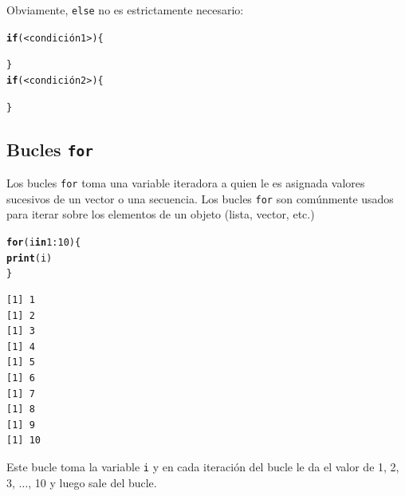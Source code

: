 \documentclass{article}\usepackage[]{graphicx}\usepackage[]{color}
\makeatletter
\newcommand{\hlnum}[1]{\textcolor[rgb]{0.686,0.059,0.569}{#1}}%
\newcommand{\hlopt}[1]{\textcolor[rgb]{0,0,0}{#1}}%
\newcommand{\hlstd}[1]{\textcolor[rgb]{0.345,0.345,0.345}{#1}}%
\newcommand{\hlkwa}[1]{\textcolor[rgb]{0.161,0.373,0.58}{\textbf{#1}}}%
\newcommand{\hlkwd}[1]{\textcolor[rgb]{0.737,0.353,0.396}{\textbf{#1}}}%
\newenvironment{kframe}{%
 \def\at@end@of@kframe{}%
 \ifinner\ifhmode%
  \def\at@end@of@kframe{\end{minipage}}%
  \begin{minipage}{\columnwidth}%
 \fi\fi%
 \def\FrameCommand##1{\hskip\@totalleftmargin \hskip-\fboxsep
 \colorbox{shadecolor}{##1}\hskip-\fboxsep
     \hskip-\linewidth \hskip-\@totalleftmargin \hskip\columnwidth}%
 \MakeFramed {\advance\hsize-\width
   \@totalleftmargin\z@ \linewidth\hsize
   \@setminipage}}%
 {\par\unskip\endMakeFramed%
 \at@end@of@kframe}
\newenvironment{knitrout}{}{} %
\makeatother
\begin{document}
  Obviamente, \texttt{else} no es estrictamente necesario:
\begin{knitrout}
\color{fgcolor}\begin{kframe}
\begin{alltt}
  \hlkwd{if}(<condición1>) \{

  \} 
  \hlkwd{if}(<condición2>) \{

  \}
\end{alltt}
\end{kframe}
\end{knitrout}

  \subsection{Bucles \texttt{for}}
  Los bucles \texttt{for} toma una variable iteradora a quien le es asignada valores sucesivos de un vector o una secuencia. Los bucles \texttt{for} son comúnmente usados para iterar sobre los elementos de un objeto (lista, vector, etc.)
\begin{knitrout}
\color{fgcolor}\begin{kframe}
\begin{alltt}
  \hlkwa{for}\hlstd{(i} \hlkwa{in} \hlnum{1}\hlopt{:}\hlnum{10}\hlstd{)\{}
    \hlkwd{print}\hlstd{(i)}
  \hlstd{\}}
\end{alltt}
\begin{verbatim}
[1] 1
[1] 2
[1] 3
[1] 4
[1] 5
[1] 6
[1] 7
[1] 8
[1] 9
[1] 10
\end{verbatim}
\end{kframe}
\end{knitrout}
  Este bucle toma la variable \texttt{i} y en cada iteración del bucle le da el valor de 1, 2, 3, $\ldots$, 10 y luego sale del bucle.
  
\end{document}
